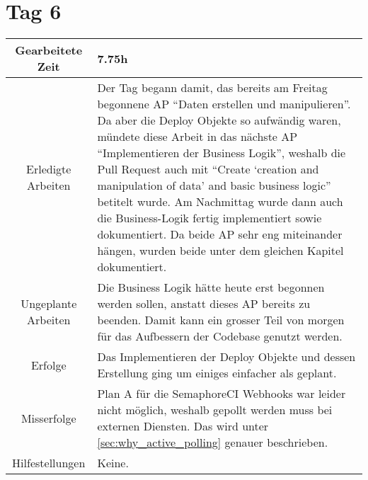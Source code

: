 \section{Tag 6}
\begin{tabularx}{\textwidth}[H]{|c|X|}
  \hline
  Gearbeitete Zeit & 7.75h \\ \hline
  Erledigte Arbeiten & Der Tag begann damit, das bereits am Freitag begonnene AP \enquote{Daten erstellen und
  manipulieren}. Da aber die Deploy Objekte so aufwändig waren, mündete diese Arbeit in das nächste AP
  \enquote{Implementieren der Business Logik}, weshalb die Pull Request auch mit \enquote{Create \enquote{creation
  and manipulation of data} and basic business logic} betitelt wurde. Am Nachmittag wurde dann auch die Business-Logik
  fertig implementiert sowie dokumentiert. Da beide AP sehr eng miteinander hängen, wurden beide unter dem gleichen
  Kapitel dokumentiert. \\ \hline
  Ungeplante Arbeiten & Die Business Logik hätte heute erst begonnen werden sollen, anstatt dieses AP bereits zu
  beenden. Damit kann ein grosser Teil von morgen für das Aufbessern der Codebase genutzt werden. \\ \hline
  Erfolge & Das Implementieren der Deploy Objekte und dessen Erstellung ging um einiges einfacher als geplant. \\ \hline
  Misserfolge & Plan A für die SemaphoreCI Webhooks war leider nicht möglich, weshalb gepollt werden muss bei externen
  Diensten. Das wird unter \ref{sec:why_active_polling} genauer beschrieben. \\ \hline
  Hilfestellungen & Keine. \\
  \hline
\end{tabularx}

\newpage

